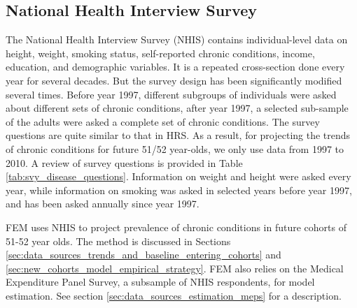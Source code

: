 \subsection{National Health Interview Survey}
The National Health Interview Survey (NHIS) contains individual-level data on height, weight, smoking 
status, self-reported chronic conditions, income, education, and demographic variables. It is a 
repeated cross-section done every year for several decades. But the survey design has been 
significantly modified several times. Before year 1997, different subgroups of individuals were asked 
about different sets of chronic conditions, after year 1997, a selected sub-sample of the adults were 
asked a complete set of chronic conditions. The survey questions are quite similar to that in HRS. As 
a result, for projecting the trends of chronic conditions for future 51/52 year-olds, we only use data 
from 1997 to 2010. A review of survey questions is provided in Table \ref{tab:svy_disease_questions}. Information on 
weight and height were asked every year, while information on smoking was asked in selected years before 
year 1997, and has been asked annually since year 1997. 

FEM uses NHIS to project prevalence of chronic conditions in future cohorts of 51-52 year olds.  The
method is discussed in Sections \ref{sec:data_sources_trends_and_baseline_entering_cohorts} and \ref{sec:new_cohorts_model_empirical_strategy}.  FEM
also relies on the Medical Expenditure Panel Survey, a subsample of NHIS respondents, for model estimation.
See section \ref{sec:data_sources_estimation_meps} for a description.

